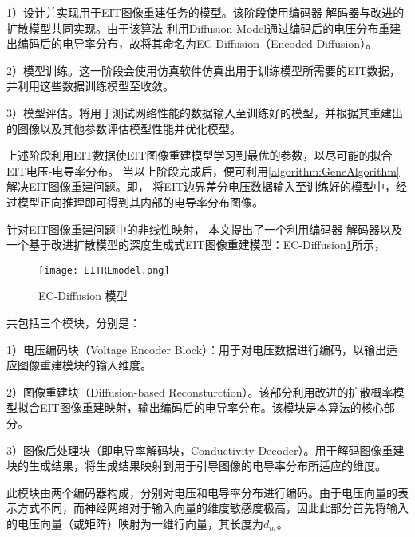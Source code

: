 1）设计并实现用于EIT图像重建任务的模型。该阶段使用编码器-解码器与改进的扩散模型共同实现。由于该算法
利用Diffusion Model通过编码后的电压分布重建出编码后的电导率分布，故将其命名为EC-Diffusion（Encoded Diffusion）。

2）模型训练。这一阶段会使用仿真软件仿真出用于训练模型所需要的EIT数据，并利用这些数据训练模型至收敛。

3）模型评估。将用于测试网络性能的数据输入至训练好的模型，并根据其重建出的图像以及其他参数评估模型性能并优化模型。

上述阶段利用EIT数据使EIT图像重建模型学习到最优的参数，以尽可能的拟合EIT电压-电导率分布。
当以上阶段完成后，便可利用\cref{algorithm:GeneAlgorithm}解决EIT图像重建问题。即，
将EIT边界差分电压数据输入至训练好的模型中，经过模型正向推理即可得到其内部的电导率分布图像。



\label{section:Model}

针对EIT图像重建问题中的非线性映射，
本文提出了一个利用编码器-解码器以及一个基于改进扩散模型的深度生成式EIT图像重建模型：EC-Diffusion\cref{figure:EITREmodel}所示，

\begin{figure}[h]
    \centering
    \texttt{[image: EITREmodel.png]}
    \caption{EC-Diffusion 模型}
    \label{figure:EITREmodel}
\end{figure}
共包括三个模块，分别是：

1）电压编码块（Voltage Encoder Block）：用于对电压数据进行编码，以输出适应图像重建模块的输入维度。

2）图像重建块（Diffusion-based Reconsturction）。该部分利用改进的扩散概率模型拟合EIT图像重建映射，输出编码后的电导率分布。该模块是本算法的核心部分。

3）图像后处理块（即电导率解码块，Conductivity Decoder）。用于解码图像重建块的生成结果，将生成结果映射到用于引导图像的电导率分布所适应的维度。















此模块由两个编码器构成，分别对电压和电导率分布进行编码。由于电压向量的表示方式不同，而神经网络对于输入向量的维度敏感度极高，因此此部分首先将输入的电压向量（或矩阵）映射为一维行向量，其长度为$d_m$。

